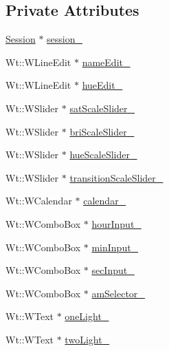\subsection*{Private Attributes}
\begin{DoxyCompactItemize}
\item 
\hyperlink{class_session}{Session} $\ast$ \hyperlink{class_scheduler_control_widget_a288a93234db52da45170f791c9014459}{session\+\_\+}
\item 
Wt\+::\+W\+Line\+Edit $\ast$ \hyperlink{class_scheduler_control_widget_afb6d2313419723521e39ee1d778efc3c}{name\+Edit\+\_\+}
\item 
Wt\+::\+W\+Line\+Edit $\ast$ \hyperlink{class_scheduler_control_widget_aeaf9ad2492fe9fcbf2133d589a86c0a3}{hue\+Edit\+\_\+}
\item 
Wt\+::\+W\+Slider $\ast$ \hyperlink{class_scheduler_control_widget_a7d6fcaadf1b4c1b5dc2463ed83aed2e3}{sat\+Scale\+Slider\+\_\+}
\item 
Wt\+::\+W\+Slider $\ast$ \hyperlink{class_scheduler_control_widget_af20be6b36f21400890eb6f09169bc3ac}{bri\+Scale\+Slider\+\_\+}
\item 
Wt\+::\+W\+Slider $\ast$ \hyperlink{class_scheduler_control_widget_a51a54fca3870348a0de577e7a10841c2}{hue\+Scale\+Slider\+\_\+}
\item 
Wt\+::\+W\+Slider $\ast$ \hyperlink{class_scheduler_control_widget_af33baa9348cda84a1b330fa098304801}{transition\+Scale\+Slider\+\_\+}
\item 
Wt\+::\+W\+Calendar $\ast$ \hyperlink{class_scheduler_control_widget_a09cb3b1c1b563ac1f93ffe6f7d562d1d}{calendar\+\_\+}
\item 
Wt\+::\+W\+Combo\+Box $\ast$ \hyperlink{class_scheduler_control_widget_a23c3048a8008ec1296b8fbc660c7b956}{hour\+Input\+\_\+}
\item 
Wt\+::\+W\+Combo\+Box $\ast$ \hyperlink{class_scheduler_control_widget_a254d87a1ab315532cc13c179ab8ea8e2}{min\+Input\+\_\+}
\item 
Wt\+::\+W\+Combo\+Box $\ast$ \hyperlink{class_scheduler_control_widget_a3f522e0b3b6e3c2dee44230dcec56f03}{sec\+Input\+\_\+}
\item 
Wt\+::\+W\+Combo\+Box $\ast$ \hyperlink{class_scheduler_control_widget_a962a04d3d4638fce987915b227301ad6}{am\+Selector\+\_\+}
\item 
Wt\+::\+W\+Text $\ast$ \hyperlink{class_scheduler_control_widget_a0ab7ae0a5695085094ddb2da0f80ca83}{one\+Light\+\_\+}
\item 
Wt\+::\+W\+Text $\ast$ \hyperlink{class_scheduler_control_widget_a3811f8b85a16cae05f9ec9630f395349}{two\+Light\+\_\+}

\end{DoxyCompactItemize}
